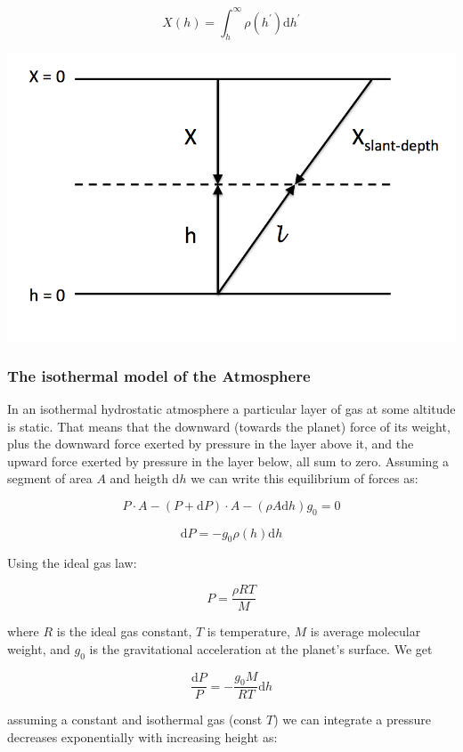 \documentclass[
  letterpaper,
  DIV=11,
  numbers=noendperiod]{scrreprt}
\begin{document}
\[X(h) =\int_h^{\infty} \rho(h^\prime)\mathrm{ d}h^\prime\]

\includegraphics{images/atmos.png}

\subsubsection*{The isothermal model of the
Atmosphere}\label{the-isothermal-model-of-the-atmosphere}

In an isothermal hydrostatic atmosphere a particular layer of gas at
some altitude is static. That means that the downward (towards the
planet) force of its weight, plus the downward force exerted by pressure
in the layer above it, and the upward force exerted by pressure in the
layer below, all sum to zero. Assuming a segment of area \(A\) and
heigth \(\mathrm{ d}h\) we can write this equilibrium of forces as:

\[P\cdot A - (P + \mathrm{ d}P)\cdot A - (\rho A \mathrm{ d}h)g_0  =0\]

\[\mathrm{ d}P = -g_0\rho(h) \mathrm{ d}h\]

Using the ideal gas law:

\[ P = \frac{\rho R T}{M}\]

where \(R\) is the ideal gas constant, \(T\) is temperature, \(M\) is
average molecular weight, and \(g_0\) is the gravitational acceleration
at the planet's surface. We get

\[\frac{\mathrm{ d}P}{P} = -\frac{g_0 M}{R T} \mathrm{ d} h\]

assuming a constant and isothermal gas (const \(T\)) we can integrate a
pressure decreases exponentially with increasing height as:
\end{document}
